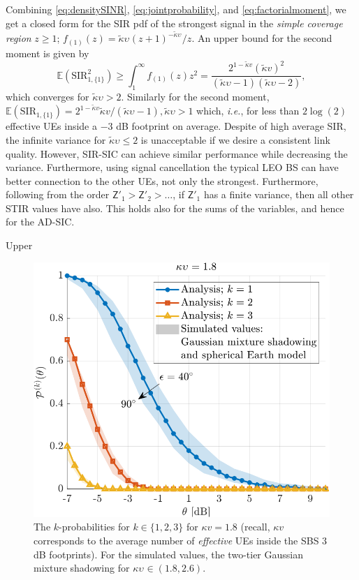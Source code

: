 \documentclass[lettersize,journal]{IEEEtran}
\begin{document}
Combining \eqref{eq:densitySINR}, \eqref{eq:jointprobability}, and \eqref{eq:factorialmoment}, we get a closed form for the SIR pdf of the strongest signal in the \textit{simple coverage region} $z\geq 1$; $f_{(1)}(z) =  {\tilde{\kappa}\upsilon_{}\left({z + 1} \right)^{-\tilde{\kappa}\upsilon_{}}}/{z}$. An upper bound for the second moment is given by
\begin{equation}
  \label{eq:SIR1}
\mathbb{E}(\text{SIR}^2_{1,\{1\}}) \geq \int_{1}^{\infty}f_{(1)}(z) z^2 = \frac{2^{1-\tilde{\kappa}v}(\tilde{\kappa}v)^2}{(\tilde{\kappa}\upsilon-1)(\tilde{\kappa}\upsilon-2)},
\end{equation}
which converges for $\tilde{\kappa}\upsilon > 2$. Similarly for the second moment, $\mathbb{E}(\text{SIR}_{1,\{1\}})  = {2^{1-\tilde{\kappa}v}\tilde{\kappa}v}/{(\tilde{\kappa}\upsilon-1)},\tilde{\kappa}\upsilon>1$ which, \textit{i.e.}, for less than $2\log(2)$ effective UEs inside a $-3$ dB footprint on average. Despite of high average SIR, the infinite variance for $\tilde{\kappa}\upsilon \leq 2$ is unacceptable if we desire a consistent link quality. However, SIR-SIC can achieve similar performance while decreasing the variance. Furthermore, using signal cancellation the typical LEO BS can have better connection to the other UEs, not only the strongest. Furthermore, following from the order $\mathsf{Z}'_1 > \mathsf{Z}'_2 >\dots $, if $\mathsf{Z}'_1$ has a finite variance, then all other STIR values have also. This holds also for the sums of the variables, and hence for the AD-SIC.

Upper




  
\begin{figure}[h]
  \centering
  \includegraphics[width=\linewidth]{kprobabilities.pdf}
  \caption{The $k$-probabilities for $k \in \{1,2,3\}$ for $\kappa v=1.8$ (recall, $\kappa v$ corresponds to the average number of \textit{effective} UEs inside the SBS $3$ dB footprints). For the simulated values, the two-tier Gaussian mixture shadowing for $\kappa \upsilon_{} \in (1.8,2.6)$.
} 
  \label{fig:antennapats}
\end{figure}
\end{document}
